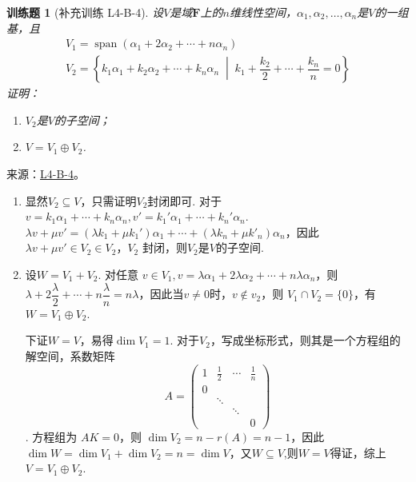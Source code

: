 \documentclass[UTF8,12pt,a4paper,fontset=fandol]{ctexart}
\newtheorem{exercise}{训练题}[section]
\begin{document}
\begin{exercise}[补充训练 L4-B-4]\label{prob:L4-B-4}
设$V$是域$\mathbf{F}$上的$n$维线性空间，$\alpha_1,\alpha_2,\ldots,\alpha_n$是$V$的一组基，且
        \begin{gather*}
            V_1=\operatorname{span}(\alpha_1+2\alpha_2+\cdots+n\alpha_n) \\
            V_2=\left\{k_1\alpha_1+k_2\alpha_2+\cdots+k_n\alpha_n \;\middle|\; k_1+\dfrac{k_2}{2}+\cdots+\dfrac{k_n}{n}=0\right\}
        \end{gather*}
        证明：
        \begin{enumerate}
            \item $V_2$是$V$的子空间；

            \item $V=V_1\oplus V_2$.
        \end{enumerate}
\end{exercise}
\noindent 来源：\href{https://github.com/yhwu-is/Linear-Algebra-Left-Undone/blob/new/%E8%AE%B2%E4%B9%89/%E4%B8%93%E9%A2%98/4%20%E7%BA%BF%E6%80%A7%E7%A9%BA%E9%97%B4%E7%9A%84%E8%BF%90%E7%AE%97.tex}{L4-B-4}。
\begin{solve}
\begin{enumerate}
                \item 显然$V_2\subseteq V$，只需证明$V_2$封闭即可. 对于$v=k_1\alpha_1+\cdots+k_n\alpha_n,v'=k_1'\alpha_1+\cdots+k_n'\alpha_n$. $\lambda v+\mu v'=(\lambda k_1+\mu k_1')\alpha_1+\cdots+(\lambda k_n+\mu k'_n)\alpha_n$，因此  $\lambda v+\mu v'\in V_2\in V_2$，$V_2$ 封闭，则$V_2$是$V$的子空间.

                \item 设$W=V_1+V_2$. 对任意 $v\in V_1,v=\lambda \alpha_1+2\lambda\alpha_2+\cdots+n\lambda\alpha_n$，则 $\lambda+2\dfrac{\lambda}2+\allowbreak\cdots+n\dfrac{\lambda}n=n\lambda$，因此当$v\ne 0$时，$v\not\in v_2$，则 $V_1\cap V_2=\{0\}$，有$W=V_1\oplus V_2$.

                      下证$W=V$，易得$\dim V_1=1$. 对于$V_2$，写成坐标形式，则其是一个方程组的解空间，系数矩阵 
\[A=\begin{pmatrix}
                              1 & \frac 12 & \cdots & \frac 1n \\
                              0 &          &        &          \\
                                & \ddots   &        &          \\
                                &          & \ddots &          \\
                                &          &        & 0
                          \end{pmatrix}\]
. 方程组为 $AK=0$，则 $\dim V_2=n-r(A)=n-1$，因此$\dim W=\dim V_1+\dim V_2=n=\dim V$，又$W\subseteq V$,则$W=V$得证，综上$V=V_1\oplus V_2$.
            \end{enumerate}
\end{solve}
\end{document}

